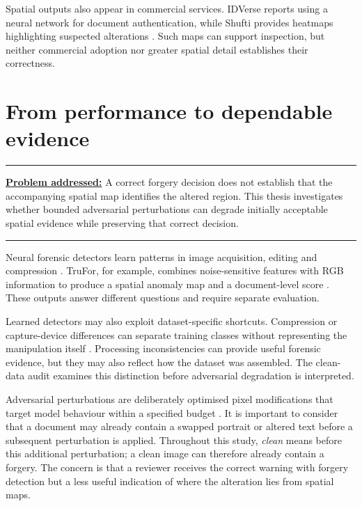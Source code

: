 Spatial outputs also appear in commercial services. IDVerse reports using a neural network for document authentication, while Shufti provides heatmaps highlighting suspected alterations \citep{LexisNexis2025IDVerse,Shufti2025Heatmaps}. Such maps can support inspection, but neither commercial adoption nor greater spatial detail establishes their correctness.


\section{From performance to dependable evidence}
\label{sec:intro-performance-to-evidence}

\begin{samepage}
\hrule
\vspace{0.6em}
\noindent\textbf{\underline{Problem addressed:}} A correct forgery decision does not establish that the accompanying spatial map identifies the altered region. This thesis investigates whether bounded adversarial perturbations can degrade initially acceptable spatial evidence while preserving that correct decision.\par
 \vspace{0.9em}
\hrule
\end{samepage}
\vspace{0.8em}
Neural forensic detectors learn patterns in image acquisition, editing and compression \parencite{verdoliva2020overview}. TruFor, for example, combines noise-sensitive features with RGB information to produce a spatial anomaly map and a document-level score \parencite{guillaro2023trufor}. These outputs answer different questions and require separate evaluation.

Learned detectors may also exploit dataset-specific shortcuts. Compression or capture-device differences can separate training classes without representing the manipulation itself \parencite{geirhos2020shortcut,Lapuschkin2019CleverHans}. Processing inconsistencies can provide useful forensic evidence, but they may also reflect how the dataset was assembled. The clean-data audit examines this distinction before adversarial degradation is interpreted.

Adversarial perturbations are deliberately optimised pixel modifications that target model behaviour within a specified budget \parencite{goodfellow2015explaining,szegedy2014intriguing}. It is important to consider that a document may already contain a swapped portrait or altered text before a subsequent perturbation is applied. Throughout this study, \emph{clean} means before this additional perturbation; a clean image can therefore already contain a forgery. The concern is that a reviewer receives the correct warning with forgery detection but a less useful indication of where the alteration lies from spatial maps.

